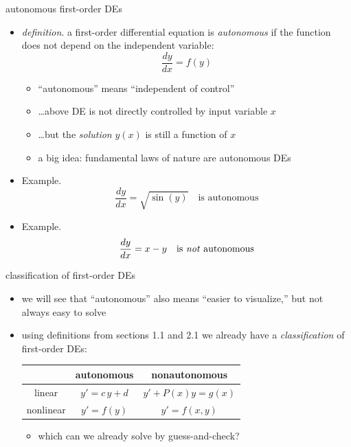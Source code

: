 \documentclass{beamer}
\begin{document}
\begin{frame}{autonomous first-order DEs}

\begin{itemize}
\item \emph{definition}. a first-order differential equation is \emph{autonomous} if the function does not depend on the independent variable:
    $$\frac{dy}{dx} = f(y)$$

\vspace{-2mm}
    \begin{itemize}
    \item ``autonomous'' means ``independent of control''
    \item \dots above DE is not directly controlled by input variable $x$
    \item \dots but the \emph{solution} $y(x)$ is still a function of $x$
    \item a big idea: fundamental laws of nature are autonomous DEs
    \end{itemize}
\item Example.
    $$\frac{dy}{dx} = \sqrt{\sin(y)} \quad \text{is autonomous}$$
\item Example.
    $$\frac{dy}{dx} = x-y \quad \text{is \emph{not} autonomous}$$
\end{itemize}
\end{frame}


\begin{frame}{classification of first-order DEs}

\begin{itemize}
\item we will see that ``autonomous'' also means ``easier to visualize,'' but not always easy to solve
\item using definitions from sections 1.1 and 2.1 we already have a \emph{classification} of first-order DEs:

\medskip
\begin{center}
\begin{tabular}{c|c|c}
 & autonomous & nonautonomous \\ \hline
linear \Large\strut & $y' = c\, y + d$ & $y' + P(x) y = g(x)$ \\ \hline
nonlinear \Large\strut & $y' = f(y)$ & $y'=f(x,y)$
\end{tabular}
\end{center}

\medskip
    \begin{itemize}
    \item which can we already solve by guess-and-check?
    \end{itemize}
\end{itemize}

\vspace{20mm}
\end{frame}
\end{document}
